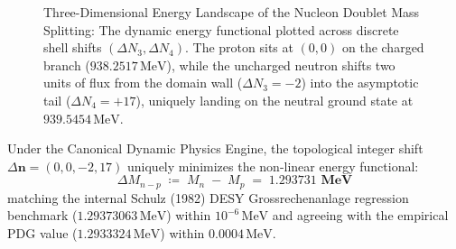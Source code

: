 \documentclass[
    12pt,
    a4paper,
    headings=normal,
    twoside=false,
    open=any,
    parskip=half
]{scrbook}
\begin{document}
\begin{figure}[htbp]
\caption{Three-Dimensional Energy Landscape of the Nucleon Doublet Mass Splitting: The dynamic energy functional plotted across discrete shell shifts $(\Delta N_3, \Delta N_4)$. The proton sits at $(0,0)$ on the charged branch ($938.2517\,\text{MeV}$), while the uncharged neutron shifts two units of flux from the domain wall ($\Delta N_3 = -2$) into the asymptotic tail ($\Delta N_4 = +17$), uniquely landing on the neutral ground state at $939.5454\,\text{MeV}$.}
\label{fig:ch3_nucleon_splitting_3d}
\end{figure}

\begin{phystheorem}\label{thm:ch3_nucleon_splitting}
Under the Canonical Dynamic Physics Engine, the topological integer shift $\Delta\mathbf{n} = (0, 0, -2, 17)$ uniquely minimizes the non-linear energy functional:
\begin{equation}
\boxed{\Delta M_{n-p} \;\coloneqq\; M_n \;-\; M_p \;=\; \mathbf{1.293731 \text{ MeV}}}
\label{eq:ch3_exact_nucleon_splitting}
\end{equation}
matching the internal Schulz (1982) DESY Grossrechenanlage regression benchmark ($1.29373063\,\text{MeV}$) within $10^{-6}\,\text{MeV}$ and agreeing with the empirical PDG value ($1.2933324\,\text{MeV}$) within $0.0004\,\text{MeV}$.
\end{phystheorem}
\end{document}
